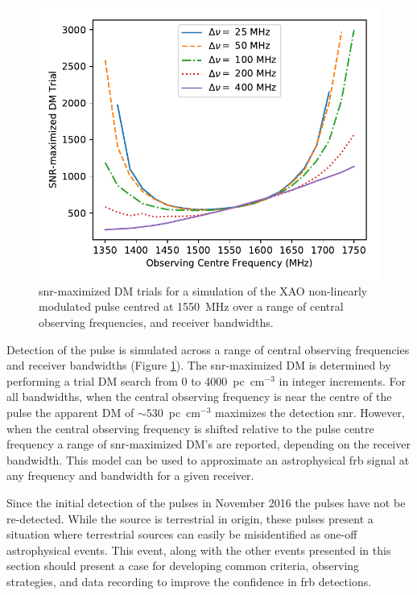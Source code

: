 \documentclass[a4paper,fleqn,usenatbib]{mnras}
\begin{document}
\begin{figure}
    \includegraphics[width=1.0\linewidth]{figures/simulatedRADARdm.pdf}
    \caption{\gls{snr}-maximized DM trials for a simulation of the XAO
    non-linearly modulated pulse centred at 1550~MHz over a range of central
    observing frequencies, and receiver bandwidths.
    }
    \label{fig:xao_simulated_dm}
\end{figure}

Detection of the pulse is simulated across a range of central observing
frequencies and receiver bandwidths (Figure \ref{fig:xao_simulated_dm}). The
\gls{snr}-maximized DM is determined by performing a trial DM search from 0 to
4000~pc~cm$^{-3}$ in integer increments.  For all bandwidths, when the central
observing frequency is near the centre of the pulse the apparent DM of
$\sim530$~pc~cm$^{-3}$ maximizes the detection \gls{snr}. However, when the
central observing frequency is shifted relative to the pulse centre frequency a
range of \gls{snr}-maximized DM's are reported, depending on the receiver
bandwidth. This model can be used to approximate an astrophysical \gls{frb}
signal at any frequency and bandwidth for a given receiver.

Since the initial detection of the pulses in November 2016 the pulses have not
be re-detected. While the source is terrestrial in origin, these pulses present a
situation where terrestrial sources can easily be misidentified as one-off
astrophysical events. This event, along with the other events presented in this
section should present a case for developing common criteria, observing
strategies, and data recording to improve the confidence in \gls{frb}
detections.
\end{document}
